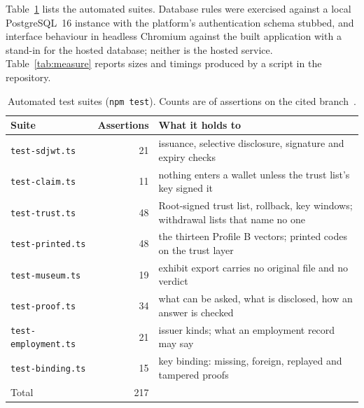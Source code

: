 \documentclass[10pt,a4paper,twocolumn]{article}
\newcommand{\code}[1]{\texttt{\small #1}}
\newenvironment{widetable}{\begin{table}[t]}{\end{table}}
\newenvironment{widetable}{\begin{table}[t]}{\end{table}}
\begin{document}
Table~\ref{tab:tests} lists the automated suites. Database rules were exercised
against a local PostgreSQL~16 instance with the platform's authentication schema
stubbed, and interface behaviour in headless Chromium against the built
application with a stand-in for the hosted database; neither is the hosted
service. Table~\ref{tab:measure} reports sizes and timings produced by a script in
the repository.

\begin{widetable}
\centering\small
\caption{Automated test suites (\code{npm test}). Counts are of assertions on the
cited branch~\citep{actik2026repo}.}
\label{tab:tests}
\begin{tabularx}{\linewidth}{@{}lrX@{}}
\toprule
Suite & Assertions & What it holds to \\
\midrule
\code{test-sdjwt.ts} & 21 & issuance, selective disclosure, signature and expiry checks \\
\code{test-claim.ts} & 11 & nothing enters a wallet unless the trust list's key signed it \\
\code{test-trust.ts} & 48 & Root-signed trust list, rollback, key windows; withdrawal lists that name no one \\
\code{test-printed.ts} & 48 & the thirteen Profile B vectors; printed codes on the trust layer \\
\code{test-museum.ts} & 19 & exhibit export carries no original file and no verdict \\
\code{test-proof.ts} & 34 & what can be asked, what is disclosed, how an answer is checked \\
\code{test-employment.ts} & 21 & issuer kinds; what an employment record may say \\
\code{test-binding.ts} & 15 & key binding: missing, foreign, replayed and tampered proofs \\
\midrule
Total & 217 & \\
\bottomrule
\end{tabularx}
\end{widetable}
\end{document}
